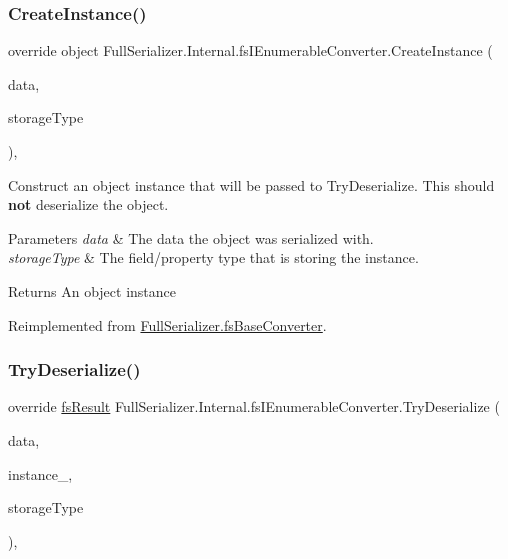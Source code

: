 \subsubsection{\texorpdfstring{Create\+Instance()}{CreateInstance()}}
{\footnotesize\ttfamily override object Full\+Serializer.\+Internal.\+fs\+I\+Enumerable\+Converter.\+Create\+Instance (\begin{DoxyParamCaption}\item[{\hyperlink{class_full_serializer_1_1fs_data}{fs\+Data}}]{data,  }\item[{Type}]{storage\+Type }\end{DoxyParamCaption})\hspace{0.3cm}{\ttfamily [inline]}, {\ttfamily [virtual]}}



Construct an object instance that will be passed to Try\+Deserialize. This should {\bfseries not} deserialize the object. 


\begin{DoxyParams}{Parameters}
{\em data} & The data the object was serialized with.\\
\hline
{\em storage\+Type} & The field/property type that is storing the instance.\\
\hline
\end{DoxyParams}
\begin{DoxyReturn}{Returns}
An object instance
\end{DoxyReturn}


Reimplemented from \hyperlink{class_full_serializer_1_1fs_base_converter_a415ea2ac9429bbb9927346af7cb7c2e1}{Full\+Serializer.\+fs\+Base\+Converter}.

\mbox{\label{class_full_serializer_1_1_internal_1_1fs_i_enumerable_converter_a1585e62338f2abf99911f4fde9599daa}} 
\subsubsection{\texorpdfstring{Try\+Deserialize()}{TryDeserialize()}}
{\footnotesize\ttfamily override \hyperlink{struct_full_serializer_1_1fs_result}{fs\+Result} Full\+Serializer.\+Internal.\+fs\+I\+Enumerable\+Converter.\+Try\+Deserialize (\begin{DoxyParamCaption}\item[{\hyperlink{class_full_serializer_1_1fs_data}{fs\+Data}}]{data,  }\item[{ref object}]{instance\+\_\+,  }\item[{Type}]{storage\+Type }\end{DoxyParamCaption})\hspace{0.3cm}{\ttfamily [inline]}, {\ttfamily [virtual]}}



